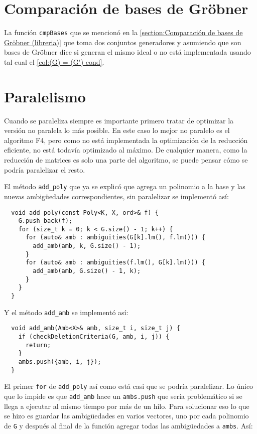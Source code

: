 \documentclass[12pt]{report}
\theoremstyle{customstyle}
\theoremstyle{factstyle}
\begin{document}
\section{Comparación de bases de Gröbner}

La función \texttt{cmpBases} que se mencionó en la \cref{section:Comparación de bases de Gröbner (libreria)} que toma dos conjuntos generadores y asumiendo que son bases de Gröbner dice si generan el mismo ideal o no está implementada usando tal cual el \cref{col:(G) = (G') cond}.

\section{Paralelismo}

Cuando se paraleliza siempre es importante primero tratar de optimizar la versión no paralela lo más posible. En este caso lo mejor no paralelo es el algoritmo F4, pero como no está implementada la optimización de la reducción eficiente, no está todavía optimizado al máximo. De cualquier manera, como la reducción de matrices es solo una parte del algoritmo, se puede pensar cómo se podría paralelizar el resto.

El método \texttt{add\_poly} que ya se explicó que agrega un polinomio a la base y las nuevas ambigüedades correspondientes, sin paralelizar se implementó así:

\begin{verbatim}
  void add_poly(const Poly<K, X, ord>& f) {
    G.push_back(f);
    for (size_t k = 0; k < G.size() - 1; k++) {
      for (auto& amb : ambiguities(G[k].lm(), f.lm())) {
        add_amb(amb, k, G.size() - 1);
      }
      for (auto& amb : ambiguities(f.lm(), G[k].lm())) {
        add_amb(amb, G.size() - 1, k);
      }
    }
  }
\end{verbatim}

Y el método \texttt{add\_amb} se implementó así:

\begin{verbatim}
  void add_amb(Amb<X>& amb, size_t i, size_t j) {
    if (checkDeletionCriteria(G, amb, i, j)) {
      return;
    }
    ambs.push({amb, i, j});
  }
\end{verbatim}

El primer \texttt{for} de \texttt{add\_poly} así como está casi que se podría paralelizar. Lo único que lo impide es que \texttt{add\_amb} hace un \texttt{ambs.push} que sería problemático si se llega a ejecutar al mismo tiempo por más de un hilo. Para solucionar eso lo que se hizo es guardar las ambigüedades en varios vectores, uno por cada polinomio de \texttt{G} y después al final de la función agregar todas las ambigüedades a \texttt{ambs}. Así:
\end{document}
